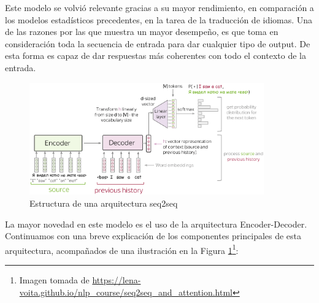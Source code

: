 Este modelo se volvió relevante gracias a su mayor rendimiento, en comparación a los modelos estadísticos precedentes, en la tarea de la traducción de idiomas. Una de las razones por las que muestra un mayor desempeño, es que toma en consideración toda la secuencia de entrada para dar cualquier tipo de output. De esta forma es capaz de dar respuestas más coherentes con todo el contexto de la entrada.

\begin{figure}[h]
	\centering
	\includegraphics[width = 0.9\textwidth]{Imagenes/Vectorial/seq2seq.pdf}
	\caption{Estructura de una arquitectura seq2seq}%
	\label{fig:seq2seq}
\end{figure}

La mayor novedad en este modelo es el uso de la arquitectura Encoder-Decoder. Continuamos con una breve explicación de los componentes principales de esta arquitectura, acompañados de una ilustración en la Figura \ref{fig:seq2seq}\footnote{Imagen tomada de \url{https://lena-voita.github.io/nlp_course/seq2seq_and_attention.html}}:

